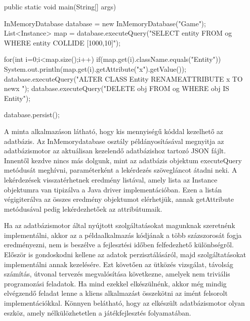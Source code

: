 
public static void main(String[] args) {
		InMemoryDatabase database = new InMemoryDatabase("Game");
		List<Instance> map = database.executeQuery("SELECT entity FROM og WHERE entity COLLIDE [1000,10]");
		
		for(int i=0;i<map.size();i++){
			if(map.get(i).className.equals("Entity")){
				System.out.println(map.get(i).getAttribute("x").getValue());
			}
		}
		database.executeQuery("ALTER CLASS Entity RENAMEATTRIBUTE x TO newx ");
		database.executeQuery("DELETE obj FROM og WHERE obj IS Entity");
		
		database.persist();
		
	}
	
A minta alkalmazáson látható, hogy kis mennyiségű kóddal kezelhető az adatbázis. Az InMemorydatabase osztály példányosításával megnyitja az adatbázismotor az aktuálisan kezelendő adatbázishoz tartozó JSON fájlt. Innentől kezdve nincs más dolgunk, mint az adatbázis objektum executeQuery metódusát meghívni, paraméterként a lekérdezés szövegláncot átadni neki. A lekérdezések visszatérhetnek eredmény listával, amely lista az Instance objektumra van tipizálva a Java driver implementációban. Ezen a listán végigiterálva az összes eredmény objektumot elérhetjük, annak getAttribute metódusával pedig lekérdezhetőek az attribútumaik.

Ha az adatbázismotor által nyújtott szolgáltatásokat magunknak szeretnénk implementálni, akkor az a példaalkalmazás kódjának a több százszorosát fogja eredményezni, nem is beszélve a fejlesztési időben felfedezhető különbségről. 
Először is gondoskodni kellene az adatok perzisztálásáról, majd   szolgáltatásokat implementálni annak kezelésére. Ezt követően az ütközés vizsgálat, távolság számítás, útvonal tervezés megvalósítása következne, amelyek nem triviális programozási feladatok. Ha mind ezekkel elkészülnénk, akkor még mindig elvégzendő feladat lenne a kliens alkalmazást összekötni az imént felsorolt implementációkkal. Könnyen belátható, hogy az elkészült adatbázismotor olyan eszköz, amely nélkülözhetetlen a játékfejlesztés folyamatában.


